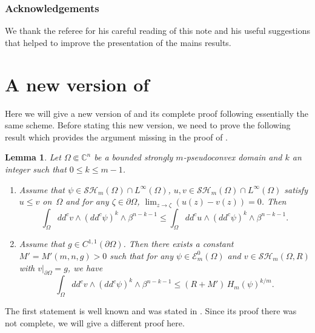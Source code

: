 \documentclass[11pt]{article}
\providecommand{\C}{}
\numberwithin{equation}{section}
\newtheorem{lemma}[theorem]{Lemma}
\theoremstyle{definition}
\renewcommand{\C}{\mathbb{C}}
\theoremstyle{plain}
\theoremstyle{definition}
\begin{document}
\subsubsection*{Acknowledgements}
We thank the referee for his careful reading of this note and his useful suggestions that helped to improve the presentation of the mains results.

\section{A new version of \texorpdfstring{\cite[Lem.\,4.2]{BZ20}}{BZ20}}

Here we will give a new version of \cite[Lem.\,4.2]{BZ20} and its complete proof following essentially the same scheme. Before stating this new version, we need to prove the following result which provides the argument missing in the proof of \cite[Lem.\,4.2]{BZ20}.

\begin{lemma} \label{lem:claim2}
Let $\Omega \Subset \C^n$ be a bounded strongly $m$-pseudoconvex domain and $k$ an integer such that $0 \leq k \leq m-1$.
\begin{enumerate}
\item
Assume that $\psi \in \mathcal{SH}_m (\Omega) \cap L^{\infty} (\Omega)$, $u,v\in \mathcal{SH}_m(\Omega)\cap L^{\infty}(\Omega)$ satisfy $u \leq v$ on~$\Omega$ and for any $\zeta \in \partial \Omega$, $\lim_{z \rightarrow \zeta }(u(z)- v(z))= 0$.
Then
\begin{equation} \label{eq:claim1}
\int_{\Omega} dd^c v \wedge (dd^c \psi)^{k} \wedge\beta^{n-k-1} \leq \int_{\Omega} dd^c u \wedge (dd^c \psi)^k \wedge\beta^{n-k-1}.
\end{equation}

\item
Assume that $g \in C^{1,1} (\partial \Omega)$. Then there exists a constant $ M' = M'(m,n,g) > 0$ such that for any $\psi \in \mathcal{E}^0_m (\Omega)$ and $v \in \mathcal{SH}_m (\Omega,R)$ with $v|_{\partial \Omega} = g$, we have
\begin{equation} \label{eq:claim2}
\int_{\Omega} dd^c v \wedge(dd^c \psi)^k\wedge\beta^{n-k-1} \leq (R + M') \, H_m(\psi)^{k\slash m} .
\end{equation}
\end{enumerate}
\end{lemma}
The first statement is well known and was stated in \cite[Cor.\,2.9]{BZ20}. Since its proof there was not complete, we will give a different proof here.
\end{document}
